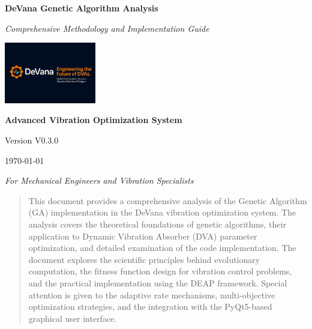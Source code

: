 \documentclass[12pt,a4paper]{article}
\begin{document}
\begin{titlepage}
    \centering
    \vspace*{2cm}
    
    {\Huge\bfseries\color{blue!70!black} DeVana Genetic Algorithm Analysis}
    
    \vspace{1cm}
    
    {\Large\textit{Comprehensive Methodology and Implementation Guide}}
    
    \vspace{2cm}
    
    \includegraphics[width=0.3\textwidth]{../../Logo.png}
    
    \vspace{2cm}
    
    {\large\textbf{Advanced Vibration Optimization System}}
    
    \vspace{0.5cm}
    
    {\large Version V0.3.0}
    
    \vfill
    
    {\large \today}
    
    \vspace{1cm}
    
    {\large\textit{For Mechanical Engineers and Vibration Specialists}}
\end{titlepage}

\tableofcontents
\newpage

\begin{abstract}
This document provides a comprehensive analysis of the Genetic Algorithm (GA) implementation in the DeVana vibration optimization system. The analysis covers the theoretical foundations of genetic algorithms, their application to Dynamic Vibration Absorber (DVA) parameter optimization, and detailed examination of the code implementation. The document explores the scientific principles behind evolutionary computation, the fitness function design for vibration control problems, and the practical implementation using the DEAP framework. Special attention is given to the adaptive rate mechanisms, multi-objective optimization strategies, and the integration with the PyQt5-based graphical user interface.
\end{abstract}
\end{document}
